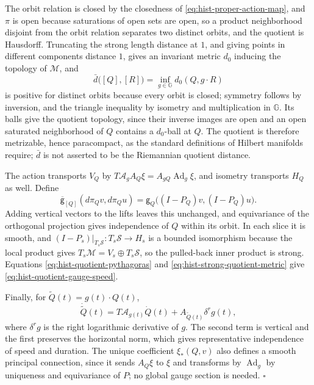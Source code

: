 The orbit relation is closed by the closedness of \eqref{eq:hist-proper-action-map},
and \(\pi\) is open because saturations of open sets are open, so a product
neighborhood disjoint from the orbit relation separates two distinct orbits, and
the quotient is Hausdorff. Truncating the strong length distance at \(1\), and
giving points in different components distance \(1\), gives an invariant metric
\(d_0\) inducing the topology of \(\mathcal M\), and
\begin{equation}
\bar d\bigl([Q],[R]\bigr)=\inf_{g\in\mathbb G}d_0(Q,g\cdot R)
\label{eq:hist-quotient-topology-metric}
\end{equation}
is positive for distinct orbits because every orbit is closed; symmetry follows
by inversion, and the triangle inequality by isometry and multiplication in
\(\mathbb G\). Its balls give the quotient topology, since their inverse images
are open and an open saturated neighborhood of \(Q\) contains a \(d_0\)-ball at
\(Q\). The quotient is therefore metrizable, hence paracompact, as the standard
definitions of Hilbert manifolds require; \(\bar d\) is not asserted to be the
Riemannian quotient distance.

The action transports \(V_Q\) by
\(T\mathscr A_gA_Q\xi=A_{gQ}\operatorname{Ad}_g\xi\), and isometry transports
\(H_Q\) as well. Define
\begin{equation}
\overline{\mathsf g}_{[Q]}(d\pi_Qv,d\pi_Qu)
=\mathsf g_Q\bigl((I-P_Q)v,(I-P_Q)u\bigr).
\label{eq:hist-strong-quotient-metric}
\end{equation}
Adding vertical vectors to the lifts leaves this unchanged, and equivariance of
the orthogonal projection gives independence of \(Q\) within its orbit. In each
slice it is smooth, and \((I-P_s)|_{T_s\mathcal S}:T_s\mathcal S\to H_s\) is a
bounded isomorphism because the local product gives
\(T_s\mathcal M=V_s\oplus T_s\mathcal S\), so the pulled-back inner product is
strong. Equations \eqref{eq:hist-quotient-pythagoras} and
\eqref{eq:hist-strong-quotient-metric} give \eqref{eq:hist-quotient-gauge-speed}.

Finally, for \(\widetilde Q(t)=g(t)\cdot Q(t)\),
\begin{equation}
\dot{\widetilde Q}(t)
=T\mathscr A_{g(t)}\dot Q(t)+A_{\widetilde Q(t)}\delta^rg(t),
\label{eq:hist-moving-quotient-representative}
\end{equation}
where \(\delta^rg\) is the right logarithmic derivative of \(g\). The second term
is vertical and the first preserves the horizontal norm, which gives
representative independence of speed and duration. The unique coefficient
\(\xi_*(Q,v)\) also defines a smooth principal connection, since it sends
\(A_Q\xi\) to \(\xi\) and transforms by \(\operatorname{Ad}_g\) by uniqueness and
equivariance of \(P\); no global gauge section is needed. \(\square\)
